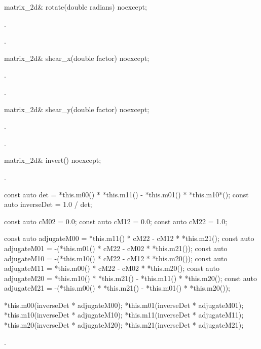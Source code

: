 \begin{itemdecl}
matrix_2d& rotate(double radians) noexcept;
\end{itemdecl}
\begin{itemdescr}
\pnum
\effects
{}.

\pnum
\returns
{}.
\end{itemdescr}

\begin{itemdecl}
matrix_2d& shear_x(double factor) noexcept;
\end{itemdecl}
\begin{itemdescr}
\pnum
\effects
{}.

\pnum
\returns
{}.
\end{itemdescr}

\begin{itemdecl}
matrix_2d& shear_y(double factor) noexcept;
\end{itemdecl}
\begin{itemdescr}
\pnum
\effects
{}.

\pnum
\returns
{}.
\end{itemdescr}

\begin{itemdecl}
matrix_2d& invert() noexcept;
\end{itemdecl}
\begin{itemdescr}
\pnum
\requires
{}.

\pnum
\effects
\begin{codeblock}
const auto det = *this.m00() * *this.m11() - *this.m01() * *this.m10*();
const auto inverseDet = 1.0 / det;

const auto cM02 = 0.0;
const auto cM12 = 0.0;
const auto cM22 = 1.0;

const auto adjugateM00 =   *this.m11() * cM22 - cM12 * *this.m21();
const auto adjugateM01 = -(*this.m01() * cM22 - cM02 * *this.m21());
const auto adjugateM10 = -(*this.m10() * cM22 - cM12 * *this.m20());
const auto adjugateM11 =   *this.m00() * cM22 - cM02 * *this.m20();
const auto adjugateM20 =   *this.m10() * *this.m21() - *this.m11() * 
  *this.m20();
const auto adjugateM21 = -(*this.m00() * *this.m21() - *this.m01() * 
  *this.m20());

*this.m00(inverseDet * adjugateM00);
*this.m01(inverseDet * adjugateM01);
*this.m10(inverseDet * adjugateM10);
*this.m11(inverseDet * adjugateM11);
*this.m20(inverseDet * adjugateM20);
*this.m21(inverseDet * adjugateM21);
\end{codeblock}

\pnum
\returns
{}.
\end{itemdescr}

